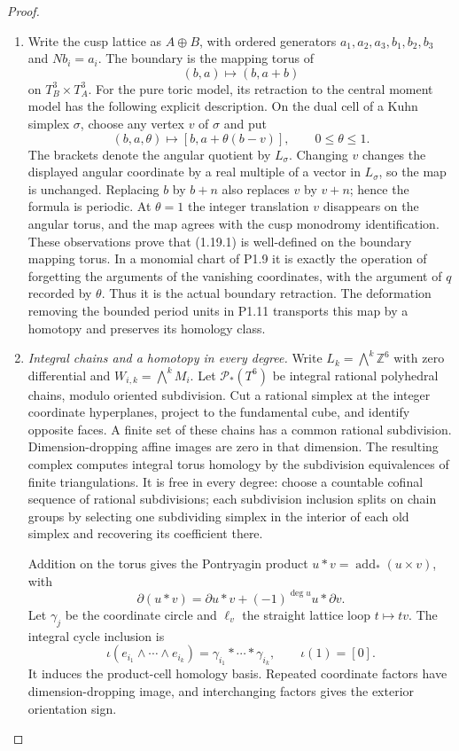 \begin{proof}
\begin{enumerate}[label=\arabic*.]
\item Write the cusp lattice as $A\oplus B$, with ordered generators
$a_1,a_2,a_3,b_1,b_2,b_3$ and $Nb_i=a_i$.
The boundary is the mapping torus of
\[
 (b,a)\longmapsto(b,a+b)
\]
on $T_B^3\times T_A^3$.
For the pure toric model, its retraction to the central moment model
has the following explicit description.  On the dual cell of a Kuhn
simplex $\sigma$, choose any vertex $v$ of $\sigma$ and put
\[
 (b,a,\theta)\longmapsto
   [b,a+\theta(b-v)],\qquad0\leq\theta\leq1.
\tag{1.19.1}
\]
The brackets denote the angular quotient by $L_\sigma$.
Changing $v$ changes the displayed angular coordinate by a real
multiple of a vector in $L_\sigma$, so the map is unchanged.
Replacing $b$ by $b+n$ also replaces $v$ by $v+n$; hence the formula
is periodic.  At $\theta=1$ the integer translation $v$ disappears
on the angular torus, and the map agrees with the cusp monodromy
identification.  These observations prove that (1.19.1) is well-defined
on the boundary mapping torus.  In a monomial chart of P1.9 it is
exactly the operation of forgetting the arguments of the vanishing
coordinates, with the argument of $q$ recorded by $\theta$.
Thus it is the actual boundary retraction.  The deformation removing
the bounded period units in P1.11 transports this map by a homotopy
and preserves its homology class.

\item \emph{Integral chains and a homotopy in every degree.}
Write $L_k=\bigwedge^k\mathbb Z^6$ with zero differential and
$W_{i,k}=\bigwedge^kM_i$. Let $\mathcal P_*(T^6)$ be integral
rational polyhedral chains, modulo oriented subdivision. Cut a
rational simplex at the integer coordinate hyperplanes, project to
the fundamental cube, and identify opposite faces. A finite set of
these chains has a common rational subdivision. Dimension-dropping
affine images are zero in that dimension. The resulting complex
computes integral torus homology by the subdivision equivalences of
finite triangulations. It is free in every degree: choose a countable
cofinal sequence of rational subdivisions; each subdivision inclusion
splits on chain groups by selecting one subdividing simplex in the
interior of each old simplex and recovering its coefficient there.

Addition on the torus gives the Pontryagin product
$u*v=\operatorname{add}_*(u\times v)$, with
\[
 \partial(u*v)=\partial u*v+(-1)^{\deg u}u*\partial v.
\]
Let $\gamma_j$ be the coordinate circle and $\ell_v$ the straight
lattice loop $t\mapsto tv$. The integral cycle inclusion is
\[
 \iota(e_{i_1}\wedge\cdots\wedge e_{i_k})
       =\gamma_{i_1}*\cdots*\gamma_{i_k},\qquad \iota(1)=[0].
\]
It induces the product-cell homology basis. Repeated coordinate
factors have dimension-dropping image, and interchanging factors
gives the exterior orientation sign.


\end{enumerate}
\end{proof}
